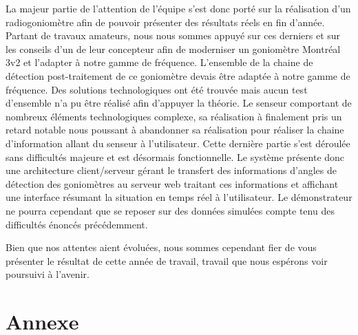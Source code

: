\documentclass[a4paper, 11pt, oneside, oldfontcommands]{memoir}
\newcounter{th}[chapter]
\begin{document}
La majeur partie de l'attention de l'équipe s'est donc porté sur la réalisation d'un radiogoniomètre afin de pouvoir présenter des résultats réels en fin d'année. Partant de travaux amateurs, nous nous sommes appuyé sur ces derniers et sur les conseils d'un de leur concepteur afin de moderniser un goniomètre Montréal 3v2 et l'adapter à notre gamme de fréquence. L'ensemble de la chaine de détection post-traitement de ce goniomètre devais être adaptée à notre gamme de fréquence. Des solutions technologiques ont été trouvée mais aucun test d'ensemble n'a pu être réalisé afin d'appuyer la théorie. Le senseur comportant de nombreux éléments technologiques complexe, sa réalisation à finalement pris un retard notable nous poussant à abandonner sa réalisation pour réaliser la chaine d'information allant du senseur à l'utilisateur. Cette dernière partie s'est déroulée sans difficultés majeure et est désormais fonctionnelle. Le système présente donc une architecture client/serveur gérant le transfert des informations d'angles de détection des goniomètres au serveur web traitant ces informations et affichant une interface résumant la situation en temps réel à l'utilisateur. Le démonstrateur ne pourra cependant que se reposer sur des données simulées compte tenu des difficultés énoncés précédemment.

Bien que nos attentes aient évoluées, nous sommes cependant fier de vous présenter le résultat de cette année de travail, travail que nous espérons voir poursuivi à l'avenir.

\newpage




\part*{Annexe}
\appendix
\nocite{*}
%
%
%









\newpage
 \listoffigures
 \printindex
 
  
\end{document}
